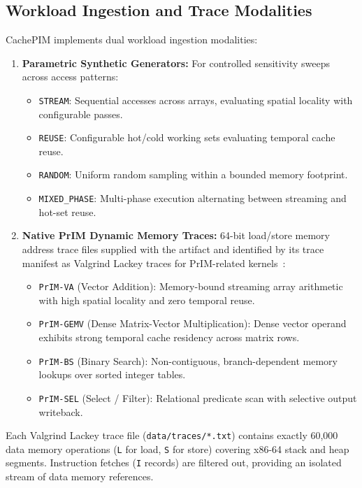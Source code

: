 \documentclass[journal,10pt,twocolumn]{IEEEtran}
\begin{document}
\subsection{Workload Ingestion and Trace Modalities}
CachePIM implements dual workload ingestion modalities:
\begin{enumerate}
    \item \textbf{Parametric Synthetic Generators:} For controlled sensitivity sweeps across access patterns:
    \begin{itemize}
        \item \texttt{STREAM}: Sequential accesses across arrays, evaluating spatial locality with configurable passes.
        \item \texttt{REUSE}: Configurable hot/cold working sets evaluating temporal cache reuse.
        \item \texttt{RANDOM}: Uniform random sampling within a bounded memory footprint.
        \item \texttt{MIXED\_PHASE}: Multi-phase execution alternating between streaming and hot-set reuse.
    \end{itemize}
    \item \textbf{Native PrIM Dynamic Memory Traces:} 64-bit load/store memory address trace files supplied with the artifact and identified by its trace manifest as Valgrind Lackey traces for PrIM-related kernels~\cite{GomezLuna2022,Nethercote2007}:
    \begin{itemize}
        \item \texttt{PrIM-VA} (Vector Addition): Memory-bound streaming array arithmetic with high spatial locality and zero temporal reuse.
        \item \texttt{PrIM-GEMV} (Dense Matrix-Vector Multiplication): Dense vector operand exhibits strong temporal cache residency across matrix rows.
        \item \texttt{PrIM-BS} (Binary Search): Non-contiguous, branch-dependent memory lookups over sorted integer tables.
        \item \texttt{PrIM-SEL} (Select / Filter): Relational predicate scan with selective output writeback.
    \end{itemize}
\end{enumerate}

Each Valgrind Lackey trace file (\texttt{data/traces/*.txt}) contains exactly 60,000 data memory operations (\texttt{L} for load, \texttt{S} for store) covering x86-64 stack and heap segments. Instruction fetches (\texttt{I} records) are filtered out, providing an isolated stream of data memory references.
\end{document}
